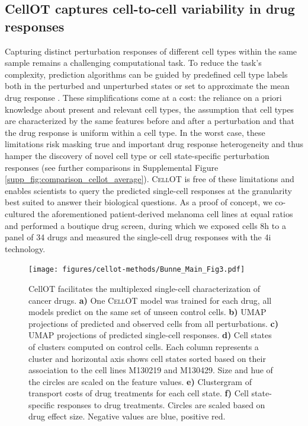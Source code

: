 \subsection{CellOT captures cell-to-cell variability in drug responses}
Capturing distinct perturbation responses of different cell types within the same sample remains a challenging computational task. To reduce the task's complexity, prediction algorithms can be guided by predefined cell type labels both in the perturbed and unperturbed states \cite{chen2020} or set to approximate the mean drug response \cite{lotfollahi2019}.  These simplifications come at a cost: the reliance on a priori knowledge about present and relevant cell types, the assumption that cell types are characterized by the same features before and after a perturbation and that the drug response is uniform within a cell type.
In the worst case, these limitations risk masking true and important drug response heterogeneity  and thus hamper the discovery of novel cell type or cell state-specific perturbation responses (see further comparisons in Supplemental Figure \ref{supp_fig:comparison_cellot_average}).
\textsc{CellOT} is free of these limitations and enables scientists to query the predicted single-cell responses at the granularity best suited to answer their biological questions.
As a proof of concept, we co-cultured the aforementioned patient-derived melanoma cell lines at equal ratios and performed a boutique drug screen, during which we exposed cells 8h to a panel of 34 drugs and measured the single-cell drug responses with the 4i technology. 

\begin{figure}
  \begin{center}
  \texttt{[image: figures/cellot-methods/Bunne\_Main\_Fig3.pdf]}
  \end{center}
    \caption{CellOT facilitates the multiplexed single-cell characterization of cancer drugs.
    \textbf{a)} One \textsc{CellOT} model was trained for each drug, all models predict on the same set of unseen control cells.
    \textbf{b)} UMAP projections of predicted and observed cells from all perturbations.
    \textbf{c)} UMAP projections of predicted single-cell responses.
    \textbf{d)} Cell states of clusters computed on control cells. Each column represents a cluster and horizontal axis shows cell states sorted based on their association to the cell lines M130219 and M130429. Size and hue of the circles are scaled on the feature values. 
    \textbf{e)} Clustergram of transport costs of drug treatments for each cell state.
    \textbf{f)} Cell state-specific responses to drug treatments. Circles are scaled based on drug effect size. Negative values are blue, positive red.}
  \label{fig:cellot-main-4i-analysis}
\end{figure}

